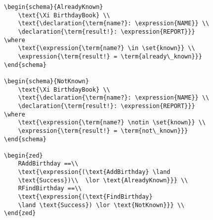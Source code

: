 \begin{verbatim}
\begin{schema}{AlreadyKnown}
    \text{\Xi BirthdayBook} \\
    \text{\declaration{\term{name?}: \expression{NAME}} \\
    \declaration{\term{result!}: \expression{REPORT}}}
\where
    \text{\expression{\term{name?} \in \set{known}} \\
    \expression{\term{result!} = \term{already\_known}}}
\end{schema}

\begin{schema}{NotKnown}
    \text{\Xi BirthdayBook} \\
    \text{\declaration{\term{name?}: \expression{NAME}} \\
    \declaration{\term{result!}: \expression{REPORT}}}
\where
    \text{\expression{\term{name?} \notin \set{known}} \\
    \expression{\term{result!} = \term{not\_known}}}
\end{schema}

\begin{zed} 
    RAddBirthday ==\\ 
    \text{\expression{(\text{AddBirthday} \land 
    \text{Success})\\  \lor \text{AlreadyKnown}}} \\
    RFindBirthday ==\\ 
    \text{\expression{(\text{FindBirthday} 
    \land \text{Success}) \lor \text{NotKnown}}} \\
\end{zed}


\end{verbatim}